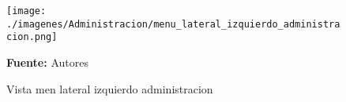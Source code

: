 \begin{figure}[!htb]
  \begin{center}
\texttt{[image: ./imagenes/Administracion/menu\_lateral\_izquierdo\_administracion.png]}
    \caption{Vista men lateral izquierdo administracion}
    \label{fig:Vista_menu_lateral_izquierdo_administracion}
    \textbf{Fuente:}  Autores
  \end{center}
\end{figure}

